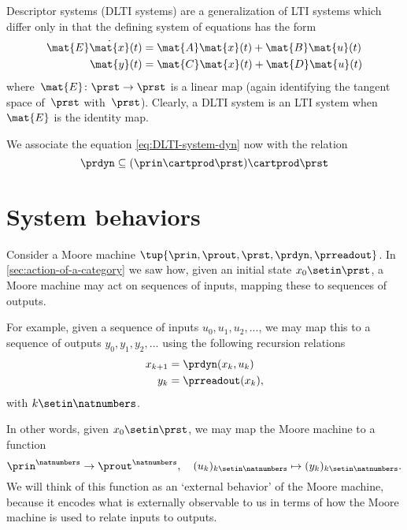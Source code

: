 Descriptor systems (DLTI systems) are a generalization of LTI systems which differ only in that the defining system of equations has the form
\begin{align}
    \mat{E} \dot{\mat{x}}(t) & = \mat{A}\mat{x}(t) + \mat{B}\mat{u}(t) \label{eq:DLTI-system-dyn} \\
    \mat{y}(t)               & = \mat{C}\mat{x}(t) + \mat{D}\mat{u}(t) \label{eq:DLTI-system-ro}
\end{align}
where~$\mat{E}\colon \prst \to \prst$ is a linear map (again identifying the tangent space of~$\prst$ with~$\prst$).
Clearly, a DLTI system is an LTI system when~$\mat{E}$ is the identity map.

We associate the equation \cref{eq:DLTI-system-dyn} now with the relation
\begin{equation*}
    \prdyn \subseteq  (\prin \cartprod \prst) \cartprod \prst
\end{equation*}

\section{System behaviors}


Consider a Moore machine $\tup{\prin, \prout, \prst, \prdyn, \prreadout}$.
In \cref{sec:action-of-a-category} we saw how, given an initial state $x_0 \setin \prst$, a Moore machine may act on sequences of inputs, mapping these to sequences of outputs.

For example, given a sequence of inputs $u_0, u_1, u_2, .
    .. $, we may map this to a sequence of outputs $y_0, y_1, y_2, ... $ using the following recursion relations
\begin{align}
    x_{k+1} & = \prdyn(x_k, u_k) \label{eq:state-recursion-1} \\
    y_{k}   & = \prreadout(x_{k}), \label{eq:state-recursion-2}
\end{align}
with $k \setin \natnumbers$.

In other words, given $x_0 \setin \prst$, we may map the Moore machine \label{eq:moore-again} to a function
\begin{equation}
    \prin^\natnumbers \to \prout^\natnumbers,  \quad (u_k)_{k \setin \natnumbers} \mapsto (y_k)_{k \setin \natnumbers}.
\end{equation}
We will think of this function as an `external behavior' of the Moore machine, because it encodes what is externally observable to us in terms of how the Moore machine is used to relate inputs to outputs.

